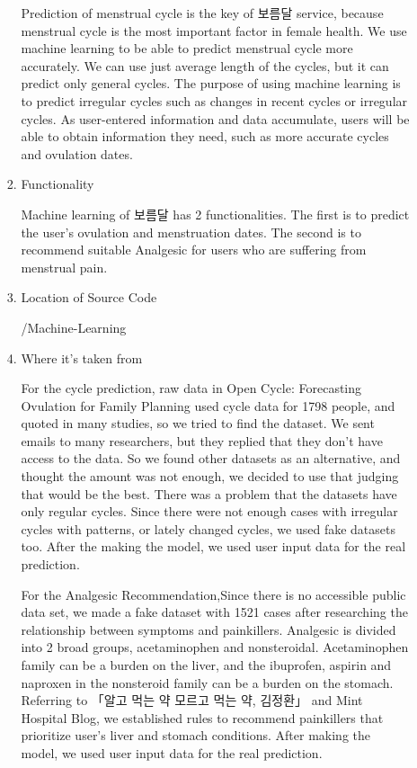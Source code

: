 \documentclass[conference]{IEEEtran}
\begin{document}
\begin{itemize}
\begin{enumerate}
\begin{enumerate}
              \setlength{\parindent}{2ex} Prediction of menstrual cycle is the key of 보름달 service, because menstrual cycle is the most important factor in female health. We use machine learning to be able to predict menstrual cycle more accurately. We can use just average length of the cycles, but it can predict only general cycles. The purpose of using machine learning is to predict irregular cycles such as changes in recent cycles or irregular cycles. As user-entered information and data accumulate, users will be able to obtain information they need, such as more accurate cycles and ovulation dates.
            \item Functionality
            
             \setlength{\parindent}{2ex}  Machine learning of 보름달 has 2 functionalities. The first is to predict the user's ovulation and menstruation dates. The second is to recommend suitable Analgesic for users who are suffering from menstrual pain.
            \item Location of Source Code
            
        
            
            /Machine-Learning
            \item Where it's taken from
            
              \setlength{\parindent}{2ex} For the cycle prediction,  raw data in Open Cycle: Forecasting Ovulation for Family Planning used cycle data for 1798 people, and quoted in many studies, so we tried to find the dataset. We sent emails to many researchers, but they replied that they don't have access to the data. So we found other datasets as an alternative, and thought the amount was not enough, we decided to use that judging that would be the best. There was a problem that the datasets have only regular cycles. Since there were not enough cases with irregular cycles with patterns, or lately changed cycles, we used fake datasets too. After the making the model, we used user input data for the real prediction.
              
              \setlength{\parindent}{2ex} For the Analgesic Recommendation,Since there is no accessible public data set, we made a fake dataset with 1521 cases after researching the relationship between symptoms and painkillers. Analgesic is divided into 2 broad groups, acetaminophen and nonsteroidal. Acetaminophen family can be a burden on the liver, and the ibuprofen, aspirin and naproxen in the nonsteroid family can be a burden on the stomach. Referring to 「알고 먹는 약 모르고 먹는 약, 김정환」 and Mint Hospital Blog, we established rules to recommend painkillers that prioritize user's liver and stomach conditions. After making the model, we used user input data for the real prediction.
              

\end{enumerate}
\end{enumerate}
\end{itemize}
\end{document}

